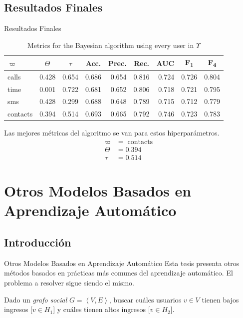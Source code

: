 \documentclass[usenames,dvipsnames,table]{beamer}
\DeclareMathOperator{\contacts}{contacts}
\newcommand{\ct}[1]{\multicolumn{1}{c}{#1}}
\begin{document}
\subsection{Resultados Finales}

\begin{frame}{Resultados Finales}
	\begin{table}
		\begin{tabular}{l r r r r r r r r}
			\toprule
			$\varpi$ & \ct{$\Theta$} & \ct{$\tau$} & \ct{Acc.} & \ct{Prec.} & \ct{Rec.} & \ct{AUC} & \ct{F\textsubscript{1}} & \ct{F\textsubscript{4}} \\
			\midrule
			calls    & 0.428 & 0.654 & 0.686 & 0.654 & 0.816 & 0.724 & 0.726 & 0.804 \\
			time     & 0.001 & 0.722 & 0.681 & 0.652 & 0.806 & 0.718 & 0.721 & 0.795 \\
			sms      & 0.428 & 0.299 & 0.688 & 0.648 & 0.789 & 0.715 & 0.712 & 0.779 \\
			contacts & 0.394 & 0.514 & 0.693 & 0.665 & 0.792 & 0.746 & 0.723 & 0.783 \\
			\bottomrule
		\end{tabular}
		\caption{Metrics for the Bayesian algorithm using every user in $\Upsilon$}
	\end{table}

	\pause{}
	Las mejores métricas del algoritmo se van para estos hiperparámetros.
	\begin{align*}
		\varpi &= \contacts \\
		\Theta &= 0.394 \\
		\tau &= 0.514
	\end{align*}
\end{frame}

\section{Otros Modelos Basados en Aprendizaje Automático}

\subsection{Introducción}

\begin{frame}{Otros Modelos Basados en Aprendizaje Automático}
	Esta tesis presenta otros métodos basados en prácticas más comunes del aprendizaje automático. El problema a resolver sigue siendo el mismo.

	\begin{block}{}
		Dado un \emph{grafo social} $G = \left< V, E \right>$, buscar cuáles usuarios $v \in V$ tienen bajos ingresos [$v \in H_1$] y cuáles tienen altos ingresos [$v \in H_2$].
	\end{block}

\end{frame}
\end{document}
